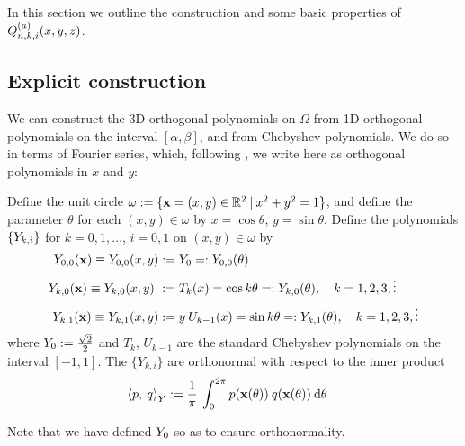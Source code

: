 \documentclass[11pt, oneside]{article}   	%
\begin{document}
In this section we outline the construction and some basic properties of $Q_{n,k,i}^{(a)}(x,y,z)$.


\subsection{Explicit construction}

We can construct the 3D orthogonal polynomials on $\Omega$ from 1D orthogonal polynomials on the interval \([\alpha,\beta]\), and from Chebyshev polynomials. We do so in terms of Fourier series, which, following \cite{olver2020orthogonal}, we write here as orthogonal polynomials in $x$ and $y$:

\begin{definition}\label{def:Ydefinition}
	Define the unit circle $\omega := \{ \mathbf{x} = (x,y) \in \mathbb{R}^2 \: | \: x^2 + y^2 = 1\}$, and define the parameter $\theta$ for each $(x,y) \in \omega$ by $x = \cos\theta$, $y = \sin\theta$. Define the polynomials $\{Y_{k,i}\}$ for $k = 0, 1, \dots$, $i = 0, 1$ on $(x,y) \in \omega$ by
\begin{align*}
	Y_{0,0}(\mathbf{x}) \equiv Y_{0,0}(x, y) &:= Y_{0} =: Y_{0,0}(\theta) \\
	Y_{k,0}(\mathbf{x}) \equiv Y_{k,0}(x, y) \ &:= T_k(x) = \cos k \theta =: Y_{k,0}(\theta), \quad k = 1,2,3,\vdots \\
	Y_{k,1}(\mathbf{x}) \equiv Y_{k,1}(x, y) &:= y \: U_{k-1}(x) = \sin k \theta =: Y_{k,1}(\theta), \quad k = 1,2,3,\vdots
\end{align*}
where $Y_{0} := \frac{\sqrt{2}}{2}$ and $T_k$, $U_{k-1}$ are the standard Chebyshev polynomials on the interval $[-1,1]$. The $\{Y_{k,i}\}$ are orthonormal with respect to the inner product
\begin{align*}
	\ip< p, \: q >_{\ch} &:= \frac{1}{\pi} \: \int_0^{2\pi} p(\xvec(\theta)) \: q(\xvec(\theta)) \: \D \theta
\end{align*}
\end{definition}
Note that we have defined $Y_0$ so as to ensure orthonormality. 
\end{document}
